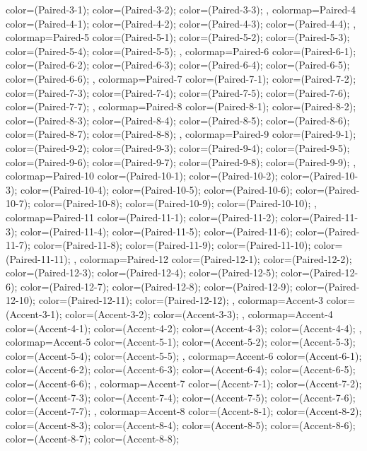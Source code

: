 {{  color=(Paired-3-1);
  color=(Paired-3-2);
  color=(Paired-3-3);
},
colormap={Paired-4}{
  color=(Paired-4-1);
  color=(Paired-4-2);
  color=(Paired-4-3);
  color=(Paired-4-4);
},
colormap={Paired-5}{
  color=(Paired-5-1);
  color=(Paired-5-2);
  color=(Paired-5-3);
  color=(Paired-5-4);
  color=(Paired-5-5);
},
colormap={Paired-6}{
  color=(Paired-6-1);
  color=(Paired-6-2);
  color=(Paired-6-3);
  color=(Paired-6-4);
  color=(Paired-6-5);
  color=(Paired-6-6);
},
colormap={Paired-7}{
  color=(Paired-7-1);
  color=(Paired-7-2);
  color=(Paired-7-3);
  color=(Paired-7-4);
  color=(Paired-7-5);
  color=(Paired-7-6);
  color=(Paired-7-7);
},
colormap={Paired-8}{
  color=(Paired-8-1);
  color=(Paired-8-2);
  color=(Paired-8-3);
  color=(Paired-8-4);
  color=(Paired-8-5);
  color=(Paired-8-6);
  color=(Paired-8-7);
  color=(Paired-8-8);
},
colormap={Paired-9}{
  color=(Paired-9-1);
  color=(Paired-9-2);
  color=(Paired-9-3);
  color=(Paired-9-4);
  color=(Paired-9-5);
  color=(Paired-9-6);
  color=(Paired-9-7);
  color=(Paired-9-8);
  color=(Paired-9-9);
},
colormap={Paired-10}{
  color=(Paired-10-1);
  color=(Paired-10-2);
  color=(Paired-10-3);
  color=(Paired-10-4);
  color=(Paired-10-5);
  color=(Paired-10-6);
  color=(Paired-10-7);
  color=(Paired-10-8);
  color=(Paired-10-9);
  color=(Paired-10-10);
},
colormap={Paired-11}{
  color=(Paired-11-1);
  color=(Paired-11-2);
  color=(Paired-11-3);
  color=(Paired-11-4);
  color=(Paired-11-5);
  color=(Paired-11-6);
  color=(Paired-11-7);
  color=(Paired-11-8);
  color=(Paired-11-9);
  color=(Paired-11-10);
  color=(Paired-11-11);
},
colormap={Paired-12}{
  color=(Paired-12-1);
  color=(Paired-12-2);
  color=(Paired-12-3);
  color=(Paired-12-4);
  color=(Paired-12-5);
  color=(Paired-12-6);
  color=(Paired-12-7);
  color=(Paired-12-8);
  color=(Paired-12-9);
  color=(Paired-12-10);
  color=(Paired-12-11);
  color=(Paired-12-12);
},
colormap={Accent-3}{
  color=(Accent-3-1);
  color=(Accent-3-2);
  color=(Accent-3-3);
},
colormap={Accent-4}{
  color=(Accent-4-1);
  color=(Accent-4-2);
  color=(Accent-4-3);
  color=(Accent-4-4);
},
colormap={Accent-5}{
  color=(Accent-5-1);
  color=(Accent-5-2);
  color=(Accent-5-3);
  color=(Accent-5-4);
  color=(Accent-5-5);
},
colormap={Accent-6}{
  color=(Accent-6-1);
  color=(Accent-6-2);
  color=(Accent-6-3);
  color=(Accent-6-4);
  color=(Accent-6-5);
  color=(Accent-6-6);
},
colormap={Accent-7}{
  color=(Accent-7-1);
  color=(Accent-7-2);
  color=(Accent-7-3);
  color=(Accent-7-4);
  color=(Accent-7-5);
  color=(Accent-7-6);
  color=(Accent-7-7);
},
colormap={Accent-8}{
  color=(Accent-8-1);
  color=(Accent-8-2);
  color=(Accent-8-3);
  color=(Accent-8-4);
  color=(Accent-8-5);
  color=(Accent-8-6);
  color=(Accent-8-7);
  color=(Accent-8-8);
}
}
